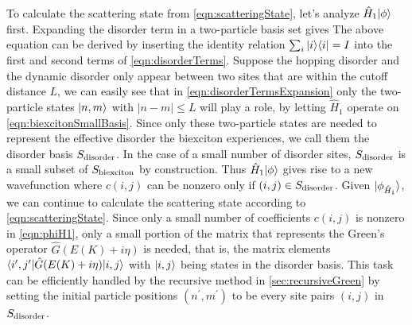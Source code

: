 To calculate the scattering state from \autoref{eqn:scatteringState}, let's analyze $\hat{H}_1 | \phi  \rangle$ first. 
Expanding the disorder term in a two-particle basis set gives
The above equation can be derived by inserting the identity relation $\sum_{i} | i \rangle\langle i | = I$ into the first and 
second terms of \autoref{eqn:disorderTerms}. Suppose the hopping disorder and the dynamic disorder only appear
between two sites that are within the cutoff distance $L$, we can easily see that in 
\autoref{eqn:disorderTermsExpansion} only  the two-particle states $| n, m \rangle$ with $|n-m|\leq L$ will play a role, by letting $\hat{H}_1$ operate on 
\autoref{eqn:biexcitonSmallBasis}. Since only these two-particle states are needed to represent the effective
 disorder the biexciton experiences, we call them the disorder basis $S_{\rm disorder}$. In the case of a small 
number of disorder sites, $S_{\rm disorder}$ is a small subset of $S_{\rm biexciton}$ by construction. Thus 
$\hat{H}_1 | \phi  \rangle$ gives rise to a new wavefunction 
where $ c(i, j)$ can be nonzero only if  $(i, j) \in S_{\rm disorder} $. Given
 $| \phi_{\hat{H}_1} \rangle$, we can continue to calculate the scattering state according to 
\autoref{eqn:scatteringState}. Since only a small number of coefficients $c(i, j)$ is nonzero in \autoref{eqn:phiH1}, 
 only  a small portion of the matrix that represents the Green's operator 
$\hat{G}(E(K) + i\eta)$ is needed, that is, the matrix elements $\langle i^{\prime}, j^{\prime} |\hat{G}(E(K) + i\eta) | i, j \rangle$ 
with $| i, j \rangle$ being states in the disorder basis. This task can be efficiently handled by the recursive method in
\autoref{sec:recursiveGreen} by setting the initial particle positions $(n^{\prime}, m^{\prime})$ to be every site 
pairs $(i, j)$ in $S_{\rm disorder}$. 

